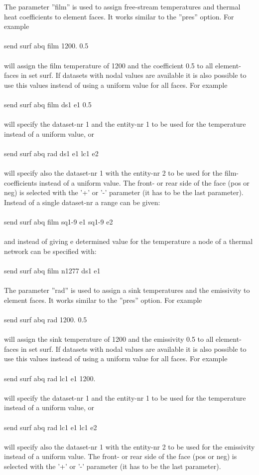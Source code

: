 \documentclass{article}
\begin{document}
The parameter ''film'' is used to assign free-stream temperatures and thermal heat coefficients to element faces. It works similar to the ''pres'' option. For example\\\\send surf abq film 1200. 0.5\\\\will assign the film temperature of 1200 and the coefficient 0.5 to all element-faces in set surf. If datasets with nodal values are available it is also possible to use this values instead of using a uniform value for all faces. For example\\\\send surf abq film ds1 e1 0.5\\\\will specify the dataset-nr 1 and the entity-nr 1 to be used for the temperature instead of a uniform value, or \\\\send surf abq rad ds1 e1 lc1 e2\\\\will specify also the dataset-nr 1 with the entity-nr 2 to be used for the film-coefficients instead of a uniform value. The front- or rear side of the face (pos or neg) is selected with the '+' or '-' parameter (it has to be the last parameter). Instead of a single dataset-nr a range can be given:\\\\send surf abq film sq1-9 e1 sq1-9 e2\\\\and instead of giving e determined value for the temperature a node of a thermal network can be specified with: \\\\send surf abq film n1277 ds1 e1\\\\

The parameter ''rad'' is used to assign a sink temperatures and the emissivity to element faces. It works similar to the ''pres'' option. For example\\\\send surf abq rad 1200. 0.5\\\\will assign the sink temperature of 1200 and the emissivity 0.5 to all element-faces in set surf. If datasets with nodal values are available it is also possible to use this values instead of using a uniform value for all faces. For example\\\\send surf abq rad lc1 e1 1200.\\\\will specify the dataset-nr 1 and the entity-nr 1 to be used for the temperature instead of a uniform value, or \\\\send surf abq rad lc1 e1 lc1 e2\\\\will specify also the dataset-nr 1 with the entity-nr 2 to be used for the emissivity instead of a uniform value. The front- or rear side of the face (pos or neg) is selected with the '+' or '-' parameter (it has to be the last parameter). 
\end{document}

